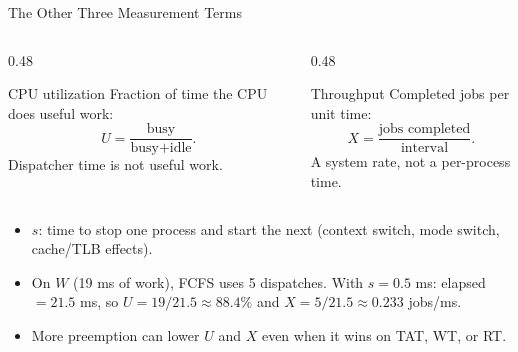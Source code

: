 \documentclass[aspectratio=169]{beamer}
\begin{document}
\begin{frame}{The Other Three Measurement Terms}
  \begin{columns}[T]
    \begin{column}{0.48\textwidth}
      \begin{block}{CPU utilization}
        Fraction of time the CPU does useful work:
        \[
          U=\frac{\text{busy}}{\text{busy}+\text{idle}}.
        \]
        Dispatcher time is not useful work.
      \end{block}
    \end{column}
    \begin{column}{0.48\textwidth}
      \begin{block}{Throughput}
        Completed jobs per unit time:
        \[
          X=\frac{\text{jobs completed}}{\text{interval}}.
        \]
        A system rate, not a per-process time.
      \end{block}
    \end{column}
  \end{columns}
  \vspace{0.1cm}
  \begin{itemize}
    \item {} $s$: time to stop one process and start the
      next (context switch, mode switch, cache/TLB effects).
    \item On $W$ (19 ms of work), FCFS uses 5 dispatches. With $s=0.5$ ms:
      elapsed $=21.5$ ms, so
      $U=19/21.5\approx 88.4\%$ and $X=5/21.5\approx 0.233$ jobs/ms.
    \item More preemption can lower $U$ and $X$ even when it wins on TAT,
      WT, or RT.
  \end{itemize}
\end{frame}
\end{document}
